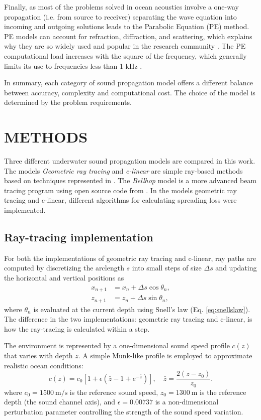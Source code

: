 \documentclass[fleqn]{jaes}
\begin{document}
Finally, as most of the problems solved in ocean acoustics involve a one-way propagation (i.e. from source to receiver) separating the wave equation into incoming and outgoing solutions leads to the
Parabolic Equation (PE) method. PE models can account for refraction, diffraction, and scattering, which explains why they are so widely used and popular in the research community \cite{Jensen}. The PE computational load increases with the square of the frequency, which generally limits its use to frequencies less than 1 kHz \cite{propagationmodels}.

In summary, each category of sound propagation model offers a different balance between accuracy, complexity and computational cost. The choice of the model is determined by the problem requirements.

\section{METHODS}
Three different underwater sound propagation models are compared in this work. The models \textit{Geometric ray tracing} and \textit{c-linear} are simple ray-based methods based on techniques represented in \cite{Jensen}. The \textit{Bellhop} model is a more advanced beam tracing program using open source code from \cite{Porter}. In the models geometric ray tracing and c-linear, different algorithms for calculating spreading loss were implemented. 

\subsection{Ray-tracing implementation}
For both the implementations of geometric ray tracing and c-linear, ray paths are computed by discretizing the arclength $s$ into small steps of size $\Delta s$ and updating the horizontal and vertical positions as
\begin{align}
    x_{n+1} &= x_n + \Delta s \cos\theta_n, \\
    z_{n+1} &= z_n + \Delta s \sin\theta_n,
\end{align}
where $\theta_n$ is evaluated at the current depth using Snell's law (Eq. \ref{eq:snellslaw}). The difference in the two implementations: geometric ray tracing and c-linear, is how the ray-tracing is calculated within a step. 

The environment is represented by a one-dimensional sound speed profile $c(z)$ that varies with depth $z$.
A simple Munk-like profile \cite{Porter} is employed to approximate realistic ocean conditions:
\begin{equation}
    c(z) = c_0 \left[ 1 + \epsilon \left( \bar{z} - 1 + e^{-\bar{z}} \right) \right],
    \quad 
    \bar{z} = \frac{2(z - z_0)}{z_0}.
\end{equation}
where $c_0 = 1500~\text{m/s}$ is the reference sound speed, $z_0 = 1300~\text{m}$ is the reference depth (the sound channel axis), and $\epsilon = 0.00737$ is a non-dimensional perturbation parameter controlling the strength of the sound speed variation.
\end{document}
